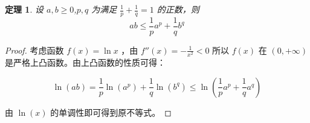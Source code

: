 \documentclass{ctexart}
\numberwithin{equation}{section}    %
\newtheorem{theorem}{定理}
\begin{document}
\begin{theorem}
    设 $a,b\geqslant 0 $,$p,q$ 为满足 $\frac{1}{p}+\frac{1}{q}=1$ 的正数，则
    \begin{equation}
        ab\leqslant\frac{1}{p}a^p+\frac{1}{q}b^q
    \end{equation}
\end{theorem}
\begin{proof}
    考虑函数 $f(x)=\ln x$ ，由 $f''(x)=-\frac{1}{x^2}<0$ 所以 $f(x)$ 在 $(0,+\infty)$ 是严格上凸函数。由上凸函数的性质可得：
    
    \begin{equation}
    \ln(ab)=\frac{1}{p}\ln(a^p)+\frac{1}{q}\ln(b^q)\leqslant\ln(\frac{1}{p}a^p+\frac{1}{q}a^q)
    \end{equation}

    由 $\ln(x)$ 的单调性即可得到原不等式。
    
\end{proof}
\end{document}
